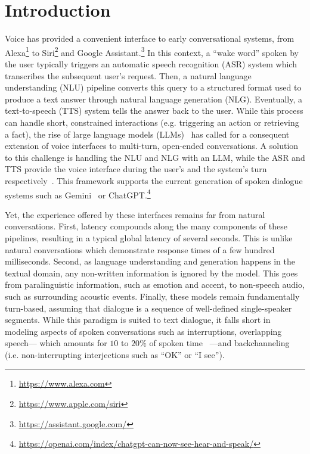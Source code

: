 \section{Introduction}

Voice has provided a convenient interface to early conversational systems, from Alexa\footnote{\url{https://www.alexa.com}} to Siri\footnote{\url{https://www.apple.com/siri}} and Google Assistant.\footnote{\url{https://assistant.google.com/}} In this context, a ``wake word'' spoken by the user typically triggers an automatic speech recognition (ASR) system which transcribes the subsequent user's request. Then, a natural language understanding (NLU) pipeline converts this query to a structured format used to produce a text answer through natural language generation (NLG). Eventually, a text-to-speech (TTS) system tells the answer back to the user. While this process can handle short, constrained interactions (e.g. triggering an action or retrieving a fact), the rise of large language models (LLMs)~\citep{gpt3,chinchilla,llama1} has called for a consequent extension of voice interfaces to multi-turn, open-ended conversations. A solution to this challenge is handling the NLU and NLG with an LLM, while the ASR and TTS provide the voice interface during the user's and the system's turn respectively~\citep{llama3herd}. This framework supports the current generation of spoken dialogue systems such as Gemini~\citep{team2023gemini} or ChatGPT.\footnote{\url{https://openai.com/index/chatgpt-can-now-see-hear-and-speak/}}%

Yet, the experience offered by these interfaces remains far from natural conversations. First, latency compounds along the many components of these pipelines, resulting in a typical global latency of several seconds. This is unlike natural conversations which demonstrate response times of a few hundred milliseconds. Second, as language understanding and generation happens in the textual domain, any non-written information is ignored by the model. This goes from paralinguistic information, such as emotion and accent, to non-speech audio, such as surrounding acoustic events. Finally, these models remain fundamentally turn-based, assuming that dialogue is a sequence of well-defined single-speaker segments. While this paradigm is suited to text dialogue, it falls short in modeling aspects of spoken conversations such as interruptions, overlapping speech--- which amounts for $10$ to $20\%$ of spoken time~\citep{overlap_stats_2} ---and backchanneling (i.e. non-interrupting interjections such as ``OK'' or ``I see'').

